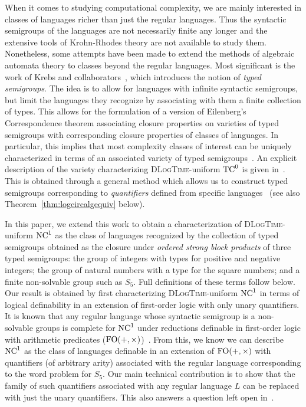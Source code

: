 \documentclass[a4paper,UKenglish,cleveref, autoref, thm-restate, anonymous]{lipics-v2021}
\begin{document}
When it comes to studying computational complexity, we are mainly interested in classes of languages richer than just the regular languages.  Thus the syntactic semigroups of the languages are not necessarily finite any longer and the extensive tools of Krohn-Rhodes theory are not available to study them.  Nonetheless, some attempts have been made to extend the methods of algebraic automata theory to classes beyond the regular languages.  Most significant is the work of Krebs and collaborators~\cite{behle2007linear,behle2011typed,krebs2007characterizing,krebs2008typed,cano2021positive}, which introduces the notion of \emph{typed semigroups}.  The idea is to allow for languages with infinite syntactic semigroups, but limit the languages they recognize by associating with them a finite collection of types.  This allows for the formulation of a version of Eilenberg's Correspondence theorem associating closure properties on varieties of typed semigroups with corresponding closure properties of classes of languages.  In particular, this implies that most complexity classes of interest can be uniquely characterized in terms of an associated variety of typed semigroups~\cite{CITE1}.  An explicit description of the variety characterizing \textsc{DLogTime}-uniform $\mathrm{TC}^0$ is given in~\cite{CITE2}.  This is obtained through a general method which allows us to construct typed semigroups corresponding to \emph{quantifiers} defined from specific languages~\cite{krebs2008typed} (see also Theorem~\ref{thm:logcircalgequiv} below).

In this paper, we extend this work to obtain a characterization of \textsc{DLogTime}-uniform $\mathrm{NC}^1$ as the class of languages recognized by the collection of typed semigroups obtained as the closure under \emph{ordered strong block products} of three typed semigroups: the group of integers with types for positive and negative integers; the group of natural numbers with a type for the square numbers; and a finite non-solvable group such as $S_5$.  Full definitions of these terms follow below.  Our result is obtained by first characterizing \textsc{DLogTime}-uniform $\mathrm{NC}^1$ in terms of logical definability in an extension of first-order logic with only unary quantifiers.  It is known that any regular language whose syntactic semigroup is a non-solvable groups is complete for $\mathrm{NC}^1$ under reductions definable in first-order logic with arithmetic predicates ($\mathrm{FO}(+,\times)$)~\cite{barrington1990uniformity}.  From this, we know we can describe $\mathrm{NC}^1$ as the class of languages definable in an extension of $\mathrm{FO}(+,\times)$ with quantifiers (of arbitrary arity) associated with the regular language corresponding to the word problem for $S_5$.  Our main technical contribution is to show that the family of such quantifiers associated with any regular language $L$ can be replaced with just the unary quantifiers.  This also answers a question left open in~\cite{lautemann2001descriptive}.
\end{document}
